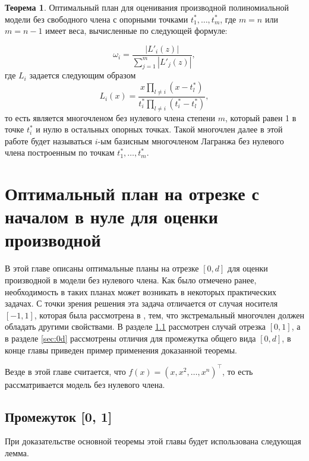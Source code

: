 \documentclass[specialist,
               substylefile = spbu.rtx,
               subf,href,colorlinks=true, 12pt]{disser}
\theoremstyle{definition}
\newtheorem{theorem}{Теорема}
\newcommand\abs[1]{\left\lvert#1\right\rvert}
\begin{document}
	\begin{theorem} \cite{melasmain}
	\label{th:weights}
	Оптимальный план для оценивания производной полиномиальной модели без свободного члена с опорными точками $t_1^*, \ldots, t_m^*$, где $m=n$ или $m=n-1$ имеет веса, вычисленные по следующей формуле:	
	
	\begin{equation}
	\label{eq:weights}
		\omega_i = \frac{\abs{L'_i(z)}}{\sum_{j=1}^m \abs{L'_j(z)}},
	\end{equation}
	где $L_i$ задается следующим образом
	\begin{equation}
		\label{eq:lagr}
		L_{i}(x) = \frac{x \prod_{l \neq i} (x - t_l^*)}{t_i^* \prod_{l \neq i} (t_i^* - t_l^*)},
	\end{equation}	
	то есть является многочленом без нулевого члена степени $m$, который равен 1 в точке $t_i^*$ и нулю в остальных опорных точках. Такой многочлен далее в этой работе будет называться $i$-ым базисным многочленом Лагранжа без нулевого члена построенным по точкам $t_1^*, \ldots, t_m^*$.
	\end{theorem}
	
	
	
  
	\chapter{Оптимальный план на отрезке с началом в нуле для оценки производной}
  
  В этой главе описаны оптимальные планы на отрезке $[0, d]$ для оценки производной в модели без нулевого члена. Как было отмечено ранее, необходимость в таких планах может возникать в некоторых практических задачах. С точки зрения решения эта задача отличается от случая носителя $[-1, 1]$, которая была рассмотрена в \cite{melasmain}, тем, что экстремальный многочлен должен обладать другими свойствами. В разделе \ref{sec:01}  рассмотрен случай отрезка $[0,1]$, а в разделе \ref{sec:0d} рассмотрены отличия для промежутка общего вида $[0, d]$, в конце главы приведен пример применения доказанной теоремы.
  
  Везде в этой главе считается, что $f(x) = (x, x^2, \ldots, x^n)^\top$, то есть рассматривается модель без нулевого члена.
  
  \section{Промежуток [0, 1]}
  \label{sec:01}
  
  При доказательстве основной теоремы этой главы будет использована следующая лемма.
  
\end{document}
